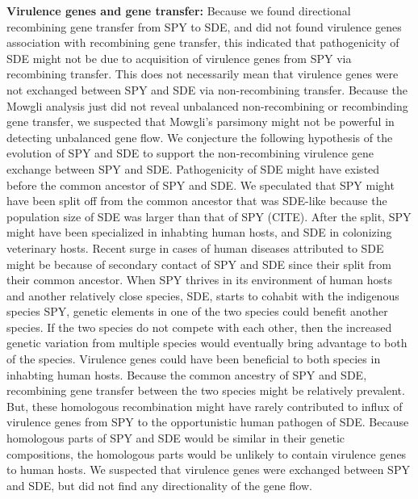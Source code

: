 \documentclass[english]{article}
\begin{document}
\textbf{Virulence genes and gene transfer:} 
Because we found directional recombining gene transfer from SPY to SDE, and
did not found virulence genes association with recombining gene transfer, 
this indicated that 
pathogenicity of SDE might not be due to acquisition of virulence genes from
SPY via recombining transfer. This does not necessarily mean that virulence
genes were not exchanged between SPY and SDE via non-recombining transfer. 
Because the Mowgli analysis just did not reveal unbalanced non-recombining or
recombinding gene transfer, we suspected that
Mowgli's parsimony might not be powerful in detecting unbalanced gene flow.
We conjecture the following hypothesis of the evolution of SPY and SDE to
support the non-recombining virulence gene exchange between SPY and SDE.
Pathogenicity of SDE might have existed before the common ancestor of SPY
and SDE.  We speculated that SPY might have been split off from the common
ancestor that was SDE-like because the population size of SDE was larger than
that of SPY (CITE). After the split, SPY might have been specialized in
inhabting human hosts, and SDE in colonizing veterinary hosts. Recent surge in
cases of human diseases attributed to SDE might be because of secondary
contact of SPY and SDE since their split from their common ancestor.  When SPY
thrives in its environment of human hosts and another relatively close species,
SDE, starts to cohabit with the indigenous species SPY, genetic elements in one
of the two species could benefit another species. If the two species do not
compete with each other, then the increased genetic variation from multiple
species would eventually bring advantage to both of the species. 
Virulence genes could have been beneficial to both species in inhabting human hosts. 
Because the common ancestry of SPY and SDE, recombining gene transfer between
the two species might be relatively prevalent. But, these homologous
recombination might have rarely contributed to influx of virulence genes from
SPY to the opportunistic human pathogen of SDE. Because homologous parts
of SPY and SDE would be similar in their genetic compositions, the homologous
parts would be unlikely to contain virulence genes to human hosts. We suspected
that virulence genes were exchanged between SPY and SDE, but did not find any
directionality of the gene flow.
\end{document}
